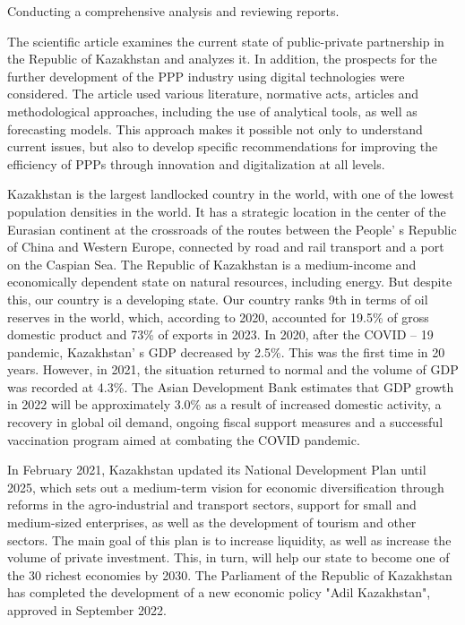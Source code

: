 Conducting a comprehensive analysis and reviewing reports.

The scientific article examines the current state of public-private
partnership in the Republic of Kazakhstan and analyzes it. In addition,
the prospects for the further development of the PPP industry using
digital technologies were considered. The article used various
literature, normative acts, articles and methodological approaches,
including the use of analytical tools, as well as forecasting models.
This approach makes it possible not only to understand current issues,
but also to develop specific recommendations for improving the
efficiency of PPPs through innovation and digitalization at all levels.

Kazakhstan is the largest landlocked country in the world, with one of
the lowest population densities in the world. It has a strategic
location in the center of the Eurasian continent at the crossroads of
the routes between the People' s Republic of China and
Western Europe, connected by road and rail transport and a port on the
Caspian Sea. The Republic of Kazakhstan is a medium-income and
economically dependent state on natural resources, including energy. But
despite this, our country is a developing state. Our country ranks 9th
in terms of oil reserves in the world, which, according to 2020,
accounted for 19.5\% of gross domestic product and 73\% of exports in
2023. In 2020, after the COVID -- 19 pandemic, Kazakhstan' s
GDP decreased by 2.5\%. This was the first time in 20 years. However, in
2021, the situation returned to normal and the volume of GDP was
recorded at 4.3\%. The Asian Development Bank estimates that GDP growth
in 2022 will be approximately 3.0\% as a result of increased domestic
activity, a recovery in global oil demand, ongoing fiscal support
measures and a successful vaccination program aimed at combating the
COVID pandemic.

In February 2021, Kazakhstan updated its National Development Plan until
2025, which sets out a medium-term vision for economic diversification
through reforms in the agro-industrial and transport sectors, support
for small and medium-sized enterprises, as well as the development of
tourism and other sectors. The main goal of this plan is to increase
liquidity, as well as increase the volume of private investment. This,
in turn, will help our state to become one of the 30 richest economies
by 2030. The Parliament of the Republic of Kazakhstan has completed the
development of a new economic policy "Adil Kazakhstan", approved in
September 2022.

